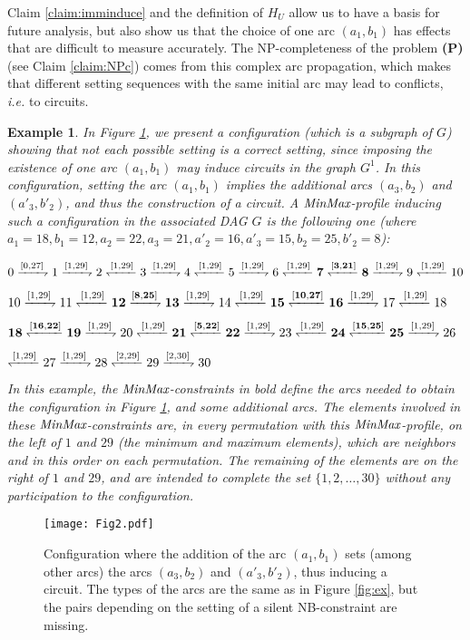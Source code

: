 \documentclass{article}
\newcommand{\M}{\mbox{\it MinMax}}
\newcommand{\rf}[1]{\xrightharpoondown{#1}}
\newcommand{\lf}[1]{\xleftharpoondown{#1}}
\newtheorem{ex}{Example}
\newcommand{\bex}{\begin{ex}\rm}
\newcommand{\eex}{\end{ex}}
\begin{document}
Claim \ref{claim:imminduce} and the definition of $H_U$ allow us to have a basis for 
future analysis, but also show us that the
choice of one arc $(a_1,b_1)$ has effects that are difficult to measure accurately. 
The NP-completeness of the problem {\bf (P)} (see Claim \ref{claim:NPc}) comes from 
this complex arc propagation, which makes that different setting sequences with the
same initial arc may lead to conflicts, {\em i.e.} to circuits.

\bex
In Figure \ref{fig:ex2}, we present a configuration (which is a subgraph of $G$) showing that not each possible
setting is a correct setting, since imposing the existence of one arc $(a_1,b_1)$ may induce
circuits in the graph $G^1$. In this configuration, setting the arc $(a_1,b_1)$ implies the additional
arcs $(a_3,b_2)$ and $(a'_3,b'_2)$, and thus the construction of a circuit. A $\M$-profile inducing such a configuration in the
associated DAG $G$ is the following one (where $a_1=18, b_1=12, a_2=22, a_3=21,
a'_2=16, a'_3=15, b_2=25, b'_2=8$):
\medskip

$0\rf{[0,27]}1\rf{[1,29]}2\lf{[1,29]}3\rf{[1,29]}4\lf{[1,29]}5\rf{[1,29]}6\lf{[1,29]}{\bf 7\lf{[3,21]}8}
\rf{[1,29]}9\lf{[1,29]}10$  

$10\rf{[1,29]}11\lf{[1,29]}{\bf 12\rf{[8,25]}13}\rf{[1,29]}14\lf{[1,29]}{\bf 15\lf{[10,27]}16}\rf{[1,29]}17\lf{[1,29]}18$

${\bf 18\lf{[16,22]}19} \rf{[1,29]}20\lf{[1,29]}{\bf 21\lf{[5,22]}22}\rf{[1,29]}23\lf{[1,29]}{\bf 24\lf{[15,25]}25}\rf{[1,29]}26$

$\lf{[1,29]}27\rf{[1,29]}28\lf{[2,29]}29\rf{[2,30]}30$
\medskip

\noindent In this example, the $\M$-constraints in bold define the arcs needed to obtain
the configuration in Figure \ref{fig:ex2}, and some additional arcs. The elements
involved in these $\M$-constraints are, in every permutation with this $\M$-profile,
on the left of $1$ and $29$ (the minimum and maximum elements), which are neighbors and
in this order on each permutation. The remaining of the elements are on the right of $1$ 
and $29$, and are intended to complete the set $\{1, 2, \ldots, 30\}$ without any
participation to the configuration.
\eex

\begin{figure}[t]
\vspace*{-1.5cm}
\begin{center}
\texttt{[image: Fig2.pdf]}
\end{center}
\vspace*{-4cm}
\caption{{\small  Configuration where the addition of  the arc $(a_1,b_1)$ sets
(among other arcs) the arcs $(a_3,b_2)$ and $(a'_3, b'_2)$, thus inducing a circuit.
The types of the arcs are the same as in Figure \ref{fig:ex}, but the pairs depending
on the setting of a silent NB-constraint are missing.}}
\label{fig:ex2}
\end{figure}
\end{document}
